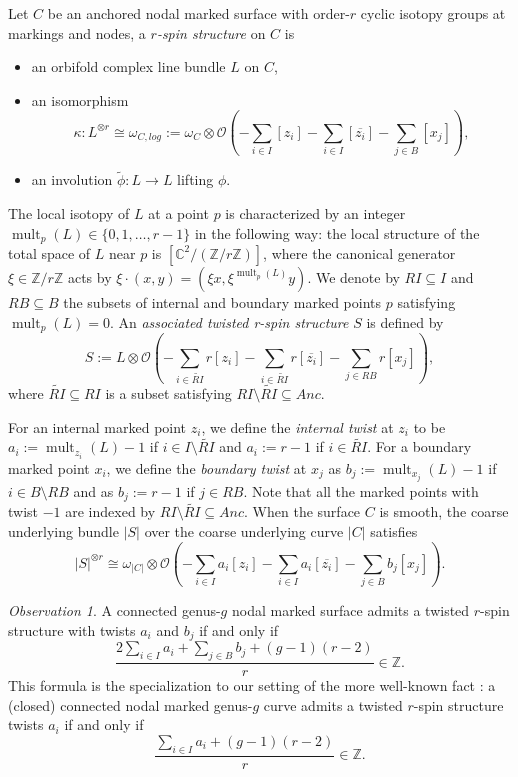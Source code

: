 \documentclass[11pt,a4paper]{article}
\theoremstyle{definition}
\theoremstyle{remark}
\newtheorem{obs}[dummy]{Observation}
\numberwithin{equation}{section}
\begin{document}
Let $C$ be an anchored nodal marked surface with
order-$r$ cyclic isotopy groups at markings and nodes, a \textit{$r$-spin structure} on $C$ is 
\begin{itemize}
    \item 
 an orbifold complex line bundle $L$ on $C$,
\item an isomorphism 
$$\kappa:L^{\otimes r} \cong \omega_{C,log}:=\omega_{C} \otimes {\mathcal{O}}\left(-\sum_{i \in I}  [z_i] - \sum_{i \in I}  [\overline{z_i}] - \sum_{j \in B} [x_j]\right),$$

\item an involution $\widetilde{\phi}: L \to L$ lifting $\phi$.
\end{itemize}
The local isotopy of $L$ at a point $p$ is characterized by an integer $\operatorname{mult}_p(L)\in \{0,1,\dots,r-1\}$ in the following way: the local structure of the total space of $L$ near $p$ is $[\mathbb C^2/(\mathbb Z/r\mathbb Z)]$, where the canonical generator $\xi \in \mathbb Z/r\mathbb Z$ acts by $\xi\cdot (x,y)=(\xi x, \xi^{\operatorname{mult}_p(L)}y)$.
We denote by $RI\subseteq I$ and $RB\subseteq B$ the subsets of internal and boundary marked points $p$ satisfying $\operatorname{mult}_p(L)=0$. An \textit{associated twisted r-spin structure} $S$ is defined by
$$
S:=L\otimes \mathcal O\left( -\sum_{i \in \widetilde{RI}} r [z_i] - \sum_{i \in \widetilde{RI}} r [\overline{z_i}] - \sum_{j \in RB} r [x_j]\right),
$$
where $\widetilde{RI}\subseteq RI$ is a subset satisfying $ RI\setminus \widetilde{RI}\subseteq Anc$.
      

For an internal marked point $z_i$, we define the  \textit{internal twist} at $z_i$ to be $a_i:=\operatorname{mult}_{z_i}(L)-1$ if $i\in I\setminus \widetilde{RI}$ and $a_i:=r-1$ if $i\in \widetilde{RI}$. For a boundary marked point $x_i$, we define the  \textit{boundary twist} at $x_j$ as $b_j:=\operatorname{mult}_{x_j}(L)-1$ if $i\in B\setminus {RB}$ and as $b_j:=r-1$ if $j\in {RB}$. Note that all the marked points with twist $-1$ are indexed by $RI\setminus \widetilde{RI}\subseteq Anc$. When the surface $C$ is smooth, the coarse underlying bundle $|S|$ over the coarse underlying curve $|C|$ satisfies
$$|S|^{\otimes r} \cong \omega_{|C|} \otimes {\mathcal{O}}\left(-\sum_{i \in I} a_i [z_i] - \sum_{i \in I} a_i [\overline{z_i}] - \sum_{j \in B} b_j[x_j]\right).$$

\begin{obs}
\label{obs rank open}
A connected genus-$g$ nodal marked surface admits a twisted $r$-spin structure with twists $a_i$ and $b_j$ if and only if
\begin{equation}\label{eq rank open}
\frac{2\sum_{i \in I} a_i + \sum_{j\in B} b_j+ (g-1)(r-2)}{r}\in \mathbb Z.
\end{equation}
This formula is the specialization to our setting of the more well-known fact \cite{Witten93}: a (closed) connected nodal marked genus-$g$ curve admits a twisted $r$-spin structure twists $a_i$ if and only if 
\begin{equation}\label{eq rank close}
\frac{\sum_{i\in I} a_i +(g-1)(r-2)}{r}\in {\mathbb{Z}}.
\end{equation}
\end{obs}
    
\end{document}
